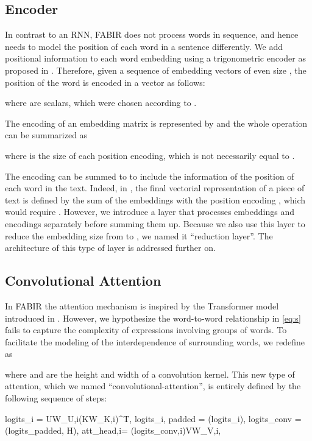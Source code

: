 \documentclass[conference, letterpaper, 10pt]{IEEEtran}
\begin{document}
\subsection{Encoder}
In contrast to an RNN, FABIR does not process words in sequence, and hence needs to model the position of each word in a sentence differently. We add positional information to each word embedding using a trigonometric encoder as proposed in \cite{Vaswani}. Therefore, given a sequence of embedding vectors of even size , the position of the  word is encoded in a vector  as follows:


where  are scalars, which were chosen according to \cite{Vaswani}.

The encoding of an embedding matrix  is represented by  and the whole operation can be summarized as


where  is the size of each position encoding, which is not necessarily equal to .

The encoding  can be summed to  to include the information of the position of each word in the text.
Indeed, in \cite{Vaswani}, the final vectorial representation of a piece of text is defined by the sum of the embeddings  with the position encoding , which would require .
However, we introduce a layer that processes embeddings and encodings separately before summing them up. Because we also use this layer to reduce the embedding size from  to , we named it {``}reduction layer{''}. The architecture of this type of layer is addressed further on.

\subsection{Convolutional Attention}
In FABIR the attention mechanism is inspired by the Transformer model introduced in \cite{Vaswani}. 
However, we hypothesize the word-to-word relationship in \eqref{eq:s} fails to capture the complexity of expressions involving groups of words.
To facilitate the modeling of the interdependence of surrounding words, we redefine  as

where  and  are the height and width of a convolution kernel. This new type of attention, which we named {``}convolutional-attention{''}, is entirely defined by the following sequence of steps:

    logits_i = UW_{U,i}(KW_{K,i})^T,
 \label{eq:conv_padding}
    logits_{i, padded} = (logits_i),
\label{eq:att_convolution}
    logits_{conv} = (logits_{padded}, H),
\label{eq:softmax_att}
    att_{head,i}= (logits_{conv,i})VW_{V,i},
\end{document}
